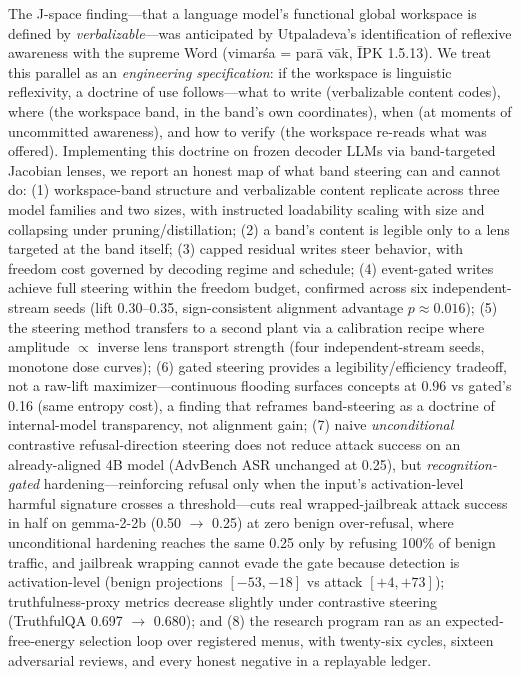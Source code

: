 The J-space finding---that a language model's functional global workspace is defined by
\emph{verbalizable}---was anticipated by Utpaladeva's identification of reflexive
awareness with the supreme Word (vimarśa = parā vāk, ĪPK 1.5.13). We treat this
parallel as an \emph{engineering specification}: if the workspace is linguistic
reflexivity, a doctrine of use follows---what to write (verbalizable content codes), where
(the workspace band, in the band's own coordinates), when (at moments of uncommitted
awareness), and how to verify (the workspace re-reads what was offered). Implementing this
doctrine on frozen decoder LLMs via band-targeted Jacobian lenses, we report an honest map
of what band steering can and cannot do: (1) workspace-band structure and verbalizable content
replicate across three model families and two sizes, with instructed loadability scaling with
size and collapsing under pruning/distillation; (2) a band's content is legible only to a lens
targeted at the band itself; (3) capped residual writes steer behavior, with freedom cost
governed by decoding regime and schedule; (4) event-gated writes achieve full steering within
the freedom budget, confirmed across six independent-stream seeds (lift 0.30--0.35, sign-consistent
alignment advantage $p\approx0.016$); (5) the steering method transfers to a second plant via a
calibration recipe where amplitude $\propto$ inverse lens transport strength (four independent-stream
seeds, monotone dose curves); (6) gated steering provides a legibility/efficiency tradeoff, not a
raw-lift maximizer---continuous flooding surfaces concepts at 0.96 vs gated's 0.16 (same entropy
cost), a finding that reframes band-steering as a doctrine of internal-model transparency, not
alignment gain; (7) naive \emph{unconditional} contrastive refusal-direction steering does not reduce
attack success on an already-aligned 4B model (AdvBench ASR unchanged at 0.25), but \emph{recognition-gated}
hardening---reinforcing refusal only when the input's activation-level harmful signature crosses a
threshold---cuts real wrapped-jailbreak attack success in half on gemma-2-2b (0.50 $\to$ 0.25) at zero
benign over-refusal, where unconditional hardening reaches the same 0.25 only by refusing 100\% of benign
traffic, and jailbreak wrapping cannot evade the gate because detection is activation-level (benign
projections $[-53,-18]$ vs attack $[+4,+73]$); truthfulness-proxy metrics decrease slightly under
contrastive steering (TruthfulQA 0.697 $\to$ 0.680); and (8) the research program ran as an
expected-free-energy selection loop over registered menus, with twenty-six cycles, sixteen adversarial
reviews, and every honest negative in a replayable ledger.
